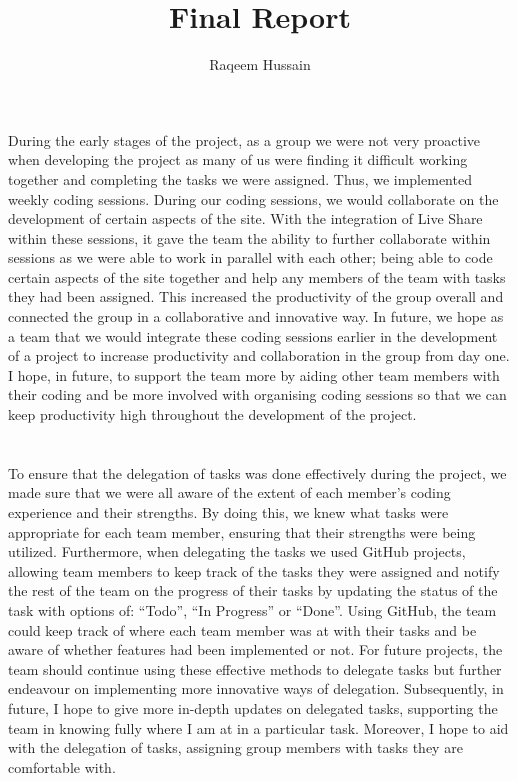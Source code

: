 \documentclass[Final Report]{article}
\begin{document}
\title{Final Report}
\author{Raqeem Hussain}
\maketitle
\newpage



\section{}
During the early stages of the project, as a group we were not very proactive when developing the project as many of us were finding it difficult working together and completing the tasks we were assigned. Thus, we implemented weekly coding sessions. During our coding sessions, we would collaborate on the development of certain aspects of the site. With the integration of Live Share within these sessions, it gave the team the ability to further collaborate within sessions as we were able to work in parallel with each other; being able to code certain aspects of the site together and help any members of the team with tasks they had been assigned. This increased the productivity of the group overall and connected the group in a collaborative and innovative way. In future, we hope as a team that we would integrate these coding sessions earlier in the development of a project to increase productivity and collaboration in the group from day one. I hope, in future, to support the team more by aiding other team members with their coding and be more involved with organising coding sessions so that we can keep productivity high throughout the development of the project.

\section{}
To ensure that the delegation of tasks was done effectively during the project, we made sure that we were all aware of the extent of each member’s coding experience and their strengths. By doing this, we knew what tasks were appropriate for each team member, ensuring that their strengths were being utilized. Furthermore, when delegating the tasks we used GitHub projects, allowing team members to keep track of the tasks they were assigned and notify the rest of the team on the progress of their tasks by updating the status of the task with options of: “Todo”, “In Progress” or “Done”. Using GitHub, the team could keep track of where each team member was at with their tasks and be aware of whether features had been implemented or not. For future projects, the team should continue using these effective methods to delegate tasks but further endeavour on implementing more innovative ways of delegation. Subsequently, in future, I hope to give more in-depth updates on delegated tasks, supporting the team in knowing fully where I am at in a particular task. Moreover, I hope to aid with the delegation of tasks, assigning group members with tasks they are comfortable with.
\end{document}
